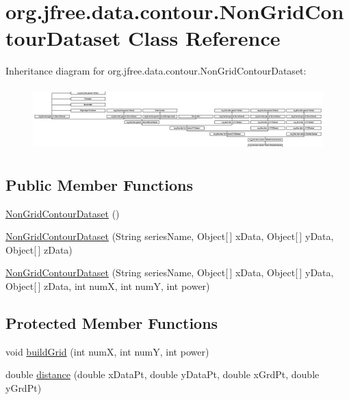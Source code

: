 \hypertarget{classorg_1_1jfree_1_1data_1_1contour_1_1_non_grid_contour_dataset}{}\section{org.\+jfree.\+data.\+contour.\+Non\+Grid\+Contour\+Dataset Class Reference}
\label{classorg_1_1jfree_1_1data_1_1contour_1_1_non_grid_contour_dataset}
Inheritance diagram for org.\+jfree.\+data.\+contour.\+Non\+Grid\+Contour\+Dataset\+:\begin{figure}[H]
\begin{center}
\leavevmode
\includegraphics[height=2.482269cm]{classorg_1_1jfree_1_1data_1_1contour_1_1_non_grid_contour_dataset}
\end{center}
\end{figure}
\subsection*{Public Member Functions}
\begin{DoxyCompactItemize}
\item 
\mbox{\hyperlink{classorg_1_1jfree_1_1data_1_1contour_1_1_non_grid_contour_dataset_a6596e031161ef6411c8de5de343fd50e}{Non\+Grid\+Contour\+Dataset}} ()
\item 
\mbox{\hyperlink{classorg_1_1jfree_1_1data_1_1contour_1_1_non_grid_contour_dataset_a827bf281fd6e6f0aea0ca0b7e6903873}{Non\+Grid\+Contour\+Dataset}} (String series\+Name, Object\mbox{[}$\,$\mbox{]} x\+Data, Object\mbox{[}$\,$\mbox{]} y\+Data, Object\mbox{[}$\,$\mbox{]} z\+Data)
\item 
\mbox{\hyperlink{classorg_1_1jfree_1_1data_1_1contour_1_1_non_grid_contour_dataset_ae375bfbb12cf82d999846d3695e08d09}{Non\+Grid\+Contour\+Dataset}} (String series\+Name, Object\mbox{[}$\,$\mbox{]} x\+Data, Object\mbox{[}$\,$\mbox{]} y\+Data, Object\mbox{[}$\,$\mbox{]} z\+Data, int numX, int numY, int power)
\end{DoxyCompactItemize}
\subsection*{Protected Member Functions}
\begin{DoxyCompactItemize}
\item 
void \mbox{\hyperlink{classorg_1_1jfree_1_1data_1_1contour_1_1_non_grid_contour_dataset_ac38661259ae32711847e564b5daed851}{build\+Grid}} (int numX, int numY, int power)
\item 
double \mbox{\hyperlink{classorg_1_1jfree_1_1data_1_1contour_1_1_non_grid_contour_dataset_a795a2ad16e8ac948c43f2257fbea1fe4}{distance}} (double x\+Data\+Pt, double y\+Data\+Pt, double x\+Grd\+Pt, double y\+Grd\+Pt)
\end{DoxyCompactItemize}
